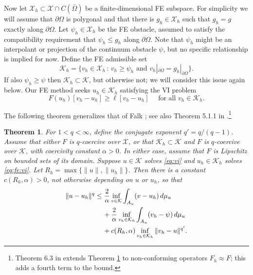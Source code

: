 \documentclass[]{interact}
\theoremstyle{plain}%
\newtheorem{theorem}{Theorem}[section]
\theoremstyle{definition}
\theoremstyle{remark}
\newcommand{\cK}{\mathcal{K}}
\newcommand{\cX}{\mathcal{X}}
\begin{document}
Now let $\cX_h \subset \cX \cap C(\bar\Omega)$ be a finite-dimensional FE subspace.  For simplicity we will assume that $\partial \Omega$ is polygonal and that there is $g_h\in\cX_h$ such that $g_h=g$ exactly along $\partial \Omega$.  Let $\psi_h \in \cX_h$ be the FE obstacle, assumed to satisfy the compatibility requirement that $\psi_h \le g_h$ along $\partial\Omega$.  Note that $\psi_h$ might be an interpolant or projection of the continuum obstacle $\psi$, but no specific relationship is implied for now.  Define the FE admissible set
\begin{equation} \label{eq:fe:admissible}
\cK_h = \{v_h \in \cX_h \,:\, v_h \ge \psi_h \text{ and } v_h|_{\partial \Omega} = g_h|_{\partial\Omega}\}.
\end{equation}
If also $\psi_h \ge \psi$ then $\cK_h\subset \cK$, but otherwise not; we will consider this issue again below.  Our FE method seeks $u_h\in\cK_h$ satisfying the VI problem
\begin{equation} \label{eq:fe:vi}
F(u_h)[v_h - u_h] \ge \ell[v_h - u_h] \quad \text{ for all } v_h \in \cK_h.
\end{equation}

The following theorem generalizes that of Falk \cite{Falk1974}; see also Theorem 5.1.1 in \cite{Ciarlet2002}.\footnote{Theorem 6.3 in \cite{Bueler2024} extends Theorem \ref{thm:genfalk} to non-conforming operators $F_h\approx F$; this adds a fourth term to the bound.}

\begin{theorem} \label{thm:genfalk}  For $1<q<\infty$, define the conjugate exponent $q'=q/(q-1)$.  Assume that either $F$ is $q$-coercive over $\cX$, or that $\cK_h\subset \cK$ and $F$ is $q$-coercive over $\cK$, with coercivity constant $\alpha>0$.  In either case, assume that $F$ is Lipschitz on bounded sets of its domain.  Suppose $u\in\cK$ solves \eqref{eq:vi} and $u_h\in\cK_h$ solves \eqref{eq:fe:vi}.  Let $R_h=\max\{\|u\|,\|u_h\|\}$.  Then there is a constant $c(R_h,\alpha)>0$, not otherwise depending on $u$ or $u_h$, so that
\begin{align}
\|u-u_h\|^q &\le \frac{2}{\alpha} \inf_{v\in\cK} \int_{A_u} (v-u_h)\,d\mu_u \label{eq:falk} \\
   &\quad\, + \frac{2}{\alpha} \inf_{v_h\in\cK_h} \int_{A_u} (v_h-\psi)\,d\mu_u \notag \\
   &\quad\, + c(R_h,\alpha) \inf_{v_h\in\cK_h} \|v_h - u\|^{q'}. \notag
\end{align}
\end{theorem}
\end{document}
